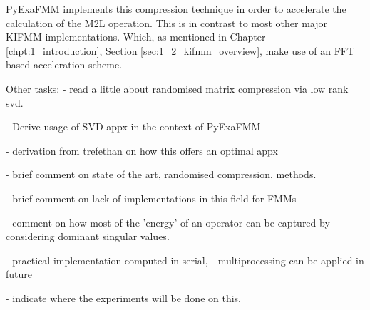 \gls{PyExaFMM} implements this compression technique in order to accelerate the
calculation of the \gls{M2L} operation. This is in contrast to most other major
\gls{KIFMM} implementations. Which, as mentioned in Chapter
\ref{chpt:1_introduction}, Section \ref{sec:1_2_kifmm_overview}, make use of
an \gls{FFT} based acceleration scheme.

Other tasks:
- read a little about randomised matrix compression via low
rank svd.

- Derive usage of SVD appx in the context of PyExaFMM

- derivation from trefethan on how this offers an optimal appx

- brief comment on state of the art, randomised compression, methods.

- brief comment on lack of implementations in this field for FMMs

- comment on how most of the 'energy' of an operator can be captured by
considering dominant singular values.

- practical implementation computed in serial,
    - multiprocessing can be applied in future

- indicate where the experiments will be done on this.